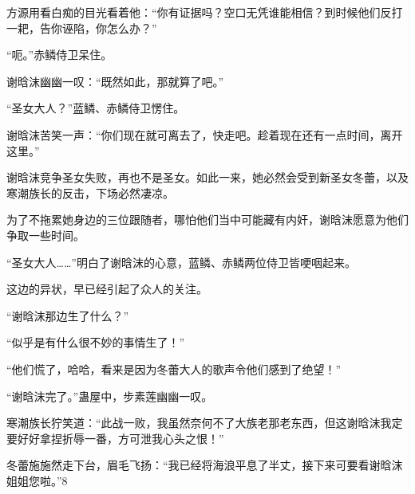 \begin{this_body}
方源用看白痴的目光看着他：“你有证据吗？空口无凭谁能相信？到时候他们反打一耙，告你诬陷，你怎么办？”

“呃。”赤鳞侍卫呆住。

谢晗沫幽幽一叹：“既然如此，那就算了吧。”

“圣女大人？”蓝鳞、赤鳞侍卫愣住。

谢晗沫苦笑一声：“你们现在就可离去了，快走吧。趁着现在还有一点时间，离开这里。”

谢晗沫竞争圣女失败，再也不是圣女。如此一来，她必然会受到新圣女冬蕾，以及寒潮族长的反击，下场必然凄凉。

为了不拖累她身边的三位跟随者，哪怕他们当中可能藏有内奸，谢晗沫愿意为他们争取一些时间。

“圣女大人……”明白了谢晗沫的心意，蓝鳞、赤鳞两位侍卫皆哽咽起来。

这边的异状，早已经引起了众人的关注。

“谢晗沫那边生了什么？”

“似乎是有什么很不妙的事情生了！”

“他们慌了，哈哈，看来是因为冬蕾大人的歌声令他们感到了绝望！”

“谢晗沫完了。”蛊屋中，步素莲幽幽一叹。

寒潮族长狞笑道：“此战一败，我虽然奈何不了大族老那老东西，但这谢晗沫我定要好好拿捏折辱一番，方可泄我心头之恨！”

冬蕾施施然走下台，眉毛飞扬：“我已经将海浪平息了半丈，接下来可要看谢晗沫姐姐您啦。”8

\end{this_body}

